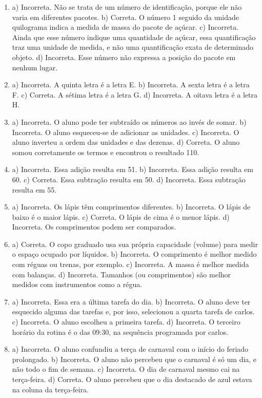 \begin{enumerate}
\item
a) Incorreta. Não se trata de um número de identificação, porque ele não varia em diferentes pacotes.
b) Correta. O número 1 seguido da unidade quilograma indica a medida de
massa do pacote de açúcar.
c) Incorreta. Ainda que esse número indique uma quantidade de açúcar,
essa quantificação traz uma unidade de medida, e não uma
quantificação exata de determinado objeto.
d) Incorreta. Esse número não expressa a posição do pacote em nenhum
lugar.

\item
a) Incorreta. A quinta letra é a letra E.
b) Incorreta. A sexta letra é a letra F.
c) Correta. A sétima letra é a letra G.
d) Incorreta. A oitava letra é a letra H.

\item
a) Incorreta. O aluno pode ter subtraído os números ao invés de
somar.
b) Incorreta. O aluno esqueceu-se de adicionar as unidades.
c) Incorreta. O aluno inverteu a ordem das unidades e das dezenas.
d) Correta. O aluno somou corretamente os termos e encontrou o resultado 110.

\item
a) Incorreta. Essa adição resulta em 51.
b) Incorreta. Essa adição resulta em 60.
c) Correta. Essa subtração resulta em 50.
d) Incorreta. Essa subtração resulta em 55.

\item
a) Incorreta. Os lápis têm comprimentos diferentes.
b) Incorreta. O lápis de baixo é o maior lápis.
c) Correta. O lápis de cima é o menor lápis.
d) Incorreta. Os comprimentos podem ser comparados.

\item
a) Correta. O copo graduado usa sua própria capacidade (volume) para
medir o espaço ocupado por líquidos.
b) Incorreta. O comprimento é melhor medido com réguas ou trenas, por exemplo.
c) Incorreta. A massa é melhor medida com balanças.
d) Incorreta. Tamanhos (ou comprimentos) são melhor medidos com instrumentos como a régua.

\item
a) Incorreta. Essa era a última tarefa do dia.
b) Incorreta. O aluno deve ter esquecido alguma das tarefas e, por isso,
selecionou a quarta tarefa de carlos.
c) Incorreta. O aluno escolheu a primeira tarefa.
d) Incorreta. O terceiro horário da rotina é o das 09:30, na sequência programada por carlos.

\item
a) Incorreta. O aluno confundiu a terça de carnaval com o início do feriado prolongado.
b) Incorreta. O aluno não percebeu que o carnaval é só um dia, e não todo
o fim de semana.
c) Incorreta. O dia de carnaval mesmo cai na terça-feira.
d) Correta. O aluno percebeu que o dia destacado de azul estava na coluna da terça-feira.


\end{enumerate}

